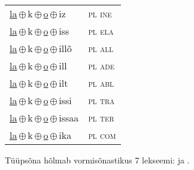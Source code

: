 \begin{minipage}{\textwidth}
\begin{sideways}
\begin{tabular}{l l}
\underline{la}\,$\oplus$\,k\,$\oplus$\,\underline{o}\,$\oplus$\,iz & \textsc{ pl ine } \\
\underline{la}\,$\oplus$\,k\,$\oplus$\,\underline{o}\,$\oplus$\,iss & \textsc{ pl ela } \\
\underline{la}\,$\oplus$\,k\,$\oplus$\,\underline{o}\,$\oplus$\,illõ & \textsc{ pl all } \\
\underline{la}\,$\oplus$\,k\,$\oplus$\,\underline{o}\,$\oplus$\,ill & \textsc{ pl ade } \\
\underline{la}\,$\oplus$\,k\,$\oplus$\,\underline{o}\,$\oplus$\,ilt & \textsc{ pl abl } \\
\underline{la}\,$\oplus$\,k\,$\oplus$\,\underline{o}\,$\oplus$\,issi & \textsc{ pl tra } \\
\underline{la}\,$\oplus$\,k\,$\oplus$\,\underline{o}\,$\oplus$\,issaa & \textsc{ pl ter } \\
\underline{la}\,$\oplus$\,k\,$\oplus$\,\underline{o}\,$\oplus$\,ika & \textsc{ pl com } \\
\end{tabular}
\end{sideways}
\label{tab:tüüpsõnamall-lako}

\end{minipage}

 
\vspace{1em}
\noindent Tüüpsõna hõlmab vormisõnastikus 7 lekseemi:  ja .
